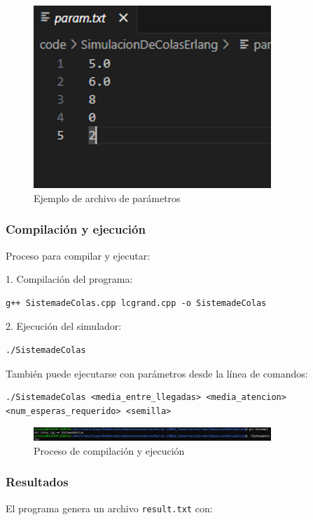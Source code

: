 \documentclass{article}
\begin{document}
\begin{figure}[H]
    \centering
    \includegraphics[width=0.8\textwidth]{images/manualUsuarioErlangBC_3.png}
    \caption{Ejemplo de archivo de parámetros}
    \label{fig:parametros_mm1}
\end{figure}

\subsubsection{Compilación y ejecución}
Proceso para compilar y ejecutar:

1. Compilación del programa:
\begin{verbatim}
g++ SistemadeColas.cpp lcgrand.cpp -o SistemadeColas
\end{verbatim}

2. Ejecución del simulador:
\begin{verbatim}
./SistemadeColas
\end{verbatim}

También puede ejecutarse con parámetros desde la línea de comandos:
\begin{verbatim}
./SistemadeColas <media_entre_llegadas> <media_atencion> <num_esperas_requerido> <semilla>
\end{verbatim}

\begin{figure}[H]
    \centering
    \includegraphics[width=0.8\textwidth]{images/manualUsuarioErlangBC_4.png}
    \caption{Proceso de compilación y ejecución}
    \label{fig:compilacion_mm1}
\end{figure}

\subsubsection{Resultados}
El programa genera un archivo \texttt{result.txt} con:
\end{document}
